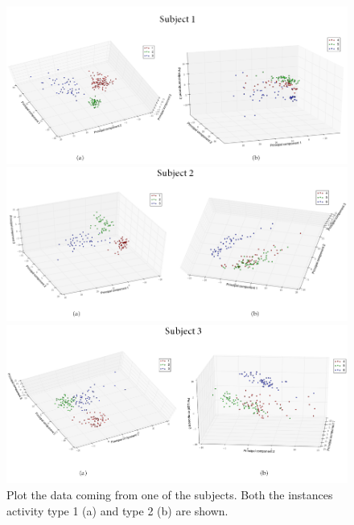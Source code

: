 \documentclass [a4paper] {report}
\begin{document}
	\begin{figure}[H]
		\begin{center}
			\includegraphics[scale=0.6]{Images/subject1.png}
		\end{center}

		\begin{center}
			\includegraphics[scale=0.6]{Images/subject2.png}
		\end{center}

		\begin{center}
			\includegraphics[scale=0.6]{Images/subject3.png}
		\end{center}
		\caption{Plot the data coming from one of the subjects. Both the instances activity type 1 (a) and type 2 (b) are shown.}
		\label{subjects}
	\end{figure}
	
\end{document}

